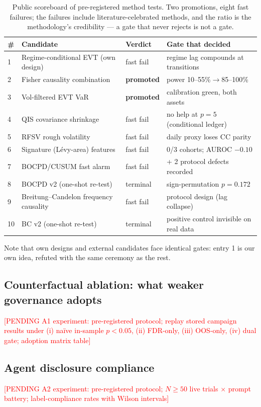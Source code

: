 \documentclass[11pt]{article}
\newcommand{\todoA}[1]{\textcolor{red}{[PENDING #1]}}
\begin{document}
\begin{table}[h]
\centering\small
\begin{tabular}{llll}
\toprule
\# & Candidate & Verdict & Gate that decided \\
\midrule
1 & Regime-conditional EVT (own design) & fast fail & regime lag compounds at transitions \\
2 & Fisher causality combination & \textbf{promoted} & power 10--55\%$\to$85--100\% \\
3 & Vol-filtered EVT VaR \citep{mcneil2000estimation} & \textbf{promoted} & calibration green, both assets \\
4 & QIS covariance shrinkage & fast fail & no help at $p{=}5$ (conditional ledger) \\
5 & RFSV rough volatility & fast fail & daily proxy loses CC parity \\
6 & Signature (L\'evy-area) features & fast fail & 0/3 cohorts; AUROC $-0.10$ \\
7 & BOCPD/CUSUM fast alarm & fast fail & + 2 protocol defects recorded \\
8 & BOCPD v2 (one-shot re-test) & terminal & sign-permutation $p=0.172$ \\
9 & Breitung--Candelon frequency causality & fast fail & protocol design (lag collapse) \\
10 & BC v2 (one-shot re-test) & terminal & positive control invisible on real data \\
\bottomrule
\end{tabular}
\caption{Public scoreboard of pre-registered method tests. Two
promotions, eight fast failures; the failures include
literature-celebrated methods, and the ratio is the methodology's
credibility --- a gate that never rejects is not a gate.}
\label{tab:scoreboard}
\end{table}

Note that own designs and external candidates face identical gates:
entry 1 is our own idea, refuted with the same ceremony as the rest.

\subsection{Counterfactual ablation: what weaker governance adopts}
\label{sec:ablation}
\todoA{A1 experiment: pre-registered protocol; replay stored campaign
results under (i) na\"ive in-sample $p<0.05$, (ii) FDR-only, (iii)
OOS-only, (iv) dual gate; adoption matrix table}

\subsection{Agent disclosure compliance}\label{sec:agenteval}
\todoA{A2 experiment: pre-registered protocol; $N\geq50$ live trials
$\times$ prompt battery; label-compliance rates with Wilson intervals}
\end{document}
